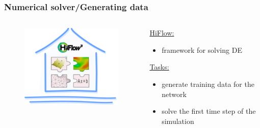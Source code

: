 \documentclass[18pt]{beamer}
\begin{document}
\begin{frame}[t]
  \frametitle{Numerical solver\slash Generating data}
    \begin{columns}
      \begin{column}{0.5\textwidth}
        \begin{figure}[htb]
          
        \end{figure}
        \begin{figure}[htb]
          \centering
          \includegraphics[scale=0.7]{images/new/hiflow_house}
        \end{figure}
      \end{column}
      \begin{column}{0.5\textwidth}
        \large{\underline{HiFlow:}}
        \begin{itemize}
        \item framework for solving DE
        \end{itemize}
        \vspace{2cm}
        \large{\underline{Tasks:}}
        \begin{itemize}
        \item generate training data for the network
        \item solve the first time step of the simulation
        \end{itemize}        
      \end{column}
  \end{columns}
\end{frame}
\end{document}
